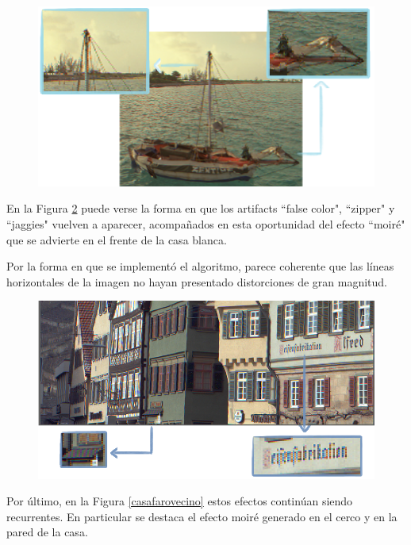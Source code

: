 \documentclass[a4paper]{article}
\begin{document}
\begin{figure}[h!]
	\caption{}
	\begin{center}
	\includegraphics[scale=0.7]{imagenes/barcovecino}
	\label{barcovecino}
  \end{center}
\end{figure}

En la Figura \ref{alemaniavecino} puede verse la forma en que los artifacts ``false color",  ``zipper" y ``jaggies" vuelven a aparecer, 
acompañados en esta oportunidad del efecto ``moiré" que se advierte en el frente de la casa blanca.

Por la forma en que se implementó el algoritmo, parece coherente que las líneas horizontales de la imagen no hayan presentado distorciones de gran magnitud.

\begin{figure}[h!]
	\caption{}
	\begin{center}
	\includegraphics[scale=0.06]{imagenes/alemaniavecino}
	\label{alemaniavecino}
  \end{center}
\end{figure}

Por último, en la Figura \ref{casafarovecino} estos efectos continúan siendo recurrentes. En particular se destaca el efecto moiré generado en el cerco y en la pared de la casa.
\end{document}

